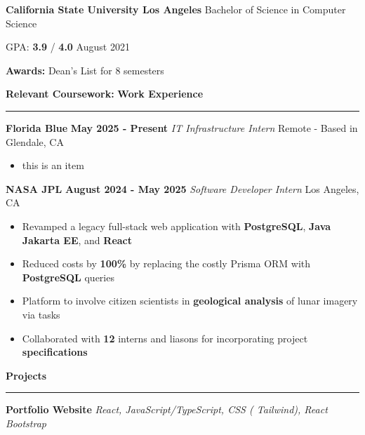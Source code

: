 \documentclass[11pt]{article}
\begin{document}
\raggedright{
\textbf{California State University Los Angeles}
\hfill{Bachelor of Science in Computer Science}

GPA: \textbf{3.9} / \textbf{4.0}
\hfill{August 2021}

\textbf{Awards: }Dean's List for 8 semesters
\newline

\textbf{Relevant Coursework:}
\textbf{Work Experience}
\vspace{-10pt}
\newline
\rule{\textwidth}{0.4pt}

\textbf{Florida Blue}
\hfill
\textbf{May 2025 - Present}
\newline
\textit{IT Infrastructure Intern}%
\hfill
Remote - Based in Glendale, CA

\begin{itemize}[itemsep=0pt, topsep=0pt]
\item this is an item
\end{itemize}

\textbf{NASA JPL}
\hfill
\textbf{August 2024 - May 2025}
\newline
\textit{Software Developer Intern}%
\hfill
Los Angeles, CA
\begin{itemize}[itemsep=0pt, topsep=0pt]
\item Revamped a legacy full-stack web application with
\textbf{
PostgreSQL},
\textbf{
Java Jakarta EE},
and \textbf{
React}
\item Reduced costs by \textbf{100\%} by replacing the costly Prisma ORM with \textbf{PostgreSQL} queries
\item Platform to involve citizen scientists in \textbf{geological analysis} of lunar imagery via tasks
\item Collaborated with \textbf{12} interns and liasons for incorporating project \textbf{specifications}
\end{itemize}

\textbf{Projects}
\vspace{-10pt}
\newline
\rule{\textwidth}{0.4pt}

\textbf{Portfolio Website {\textbar}}
\textit{
{
React,
JavaScript/TypeScript,
CSS
(
Tailwind),
React Bootstrap
}
}

}
\end{document}
